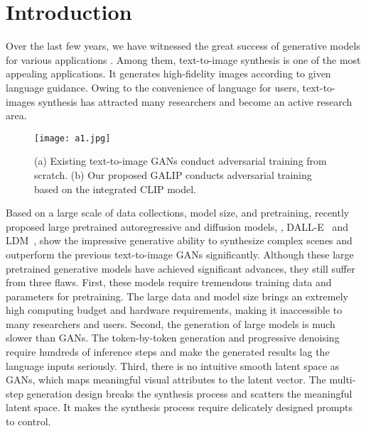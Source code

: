 \documentclass[10pt,twocolumn,letterpaper]{article}
\begin{document}
\section{Introduction}
\label{sec:intro}

Over the last few years, we have witnessed the great success of generative models for various applications \cite{wang2020deep,cheng2021fashion}. 
Among them, text-to-image synthesis\cite{hong2018inferring,li2020exploring, cheng2020rifegan, ramesh2021zero, li2019controllable, qiao2019learn, qiao2019mirrorgan, zhu2019dm, yin2019semantics, li2019object,xu2018attngan,liang2020cpgan,liu2020time,wang2022clip,xu2022predict} is one of the most appealing applications. 
It generates high-fidelity images according to given language guidance. 
Owing to the convenience of language for users, text-to-images synthesis has attracted many researchers and become an active research area.

\begin{figure}[t] \small
  \centering
  \texttt{[image: a1.jpg]}
  \caption{(a) Existing text-to-image GANs conduct adversarial training from scratch. (b) Our proposed GALIP conducts adversarial training based on the integrated CLIP model.}
  \label{fig0}
  \vspace{-0.6cm}
\end{figure}


Based on a large scale of data collections, model size, and pretraining, recently proposed large pretrained autoregressive and diffusion models, \eg, DALL-E~\cite{ramesh2021zero} and LDM~\cite{rombach2022high}, show the impressive generative ability to synthesize complex scenes and outperform the previous text-to-image GANs significantly.
Although these large pretrained generative models have achieved significant advances, they still suffer from three flaws.
First, these models require tremendous training data and parameters for pretraining.
The large data and model size brings an extremely high computing budget and hardware requirements, making it inaccessible to many researchers and users.
Second, the generation of large models is much slower than GANs. 
The token-by-token generation and progressive denoising require hundreds of inference steps and make the generated results lag the language inputs seriously. 
Third, there is no intuitive smooth latent space as GANs, which maps meaningful visual attributes to the latent vector. 
The multi-step generation design breaks the synthesis process and scatters the meaningful latent space.
It makes the synthesis process require delicately designed prompts to control.
\end{document}
